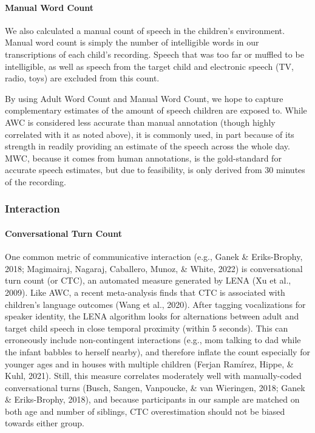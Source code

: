 \documentclass[
  man]{apa6}
\let\oldparagraph\paragraph
\renewcommand{\paragraph}[1]{\oldparagraph{#1}\mbox{}}
\begin{document}
\hypertarget{manual-word-count}{%
\paragraph{Manual Word Count}\label{manual-word-count}}

We also calculated a manual count of speech in the children's environment. Manual word count is simply the number of intelligible words in our transcriptions of each child's recording. Speech that was too far or muffled to be intelligible, as well as speech from the target child and electronic speech (TV, radio, toys) are excluded from this count.

By using Adult Word Count and Manual Word Count, we hope to capture complementary estimates of the amount of speech children are exposed to. While AWC is considered less accurate than manual annotation (though highly correlated with it as noted above), it is commonly used, in part because of its strength in readily providing an estimate of the speech across the whole day. MWC, because it comes from human annotations, is the gold-standard for accurate speech estimates, but due to feasibility, is only derived from 30 minutes of the recording.

\hypertarget{interaction}{%
\subsubsection{Interaction}\label{interaction}}

\hypertarget{conversational-turn-count}{%
\paragraph{Conversational Turn Count}\label{conversational-turn-count}}

One common metric of communicative interaction (e.g., Ganek \& Eriks-Brophy, 2018; Magimairaj, Nagaraj, Caballero, Munoz, \& White, 2022) is conversational turn count (or CTC), an automated measure generated by LENA (Xu et al., 2009). Like AWC, a recent meta-analysis finds that CTC is associated with children's language outcomes (Wang et al., 2020). After tagging vocalizations for speaker identity, the LENA algorithm looks for alternations between adult and target child speech in close temporal proximity (within 5 seconds). This can erroneously include non-contingent interactions (e.g., mom talking to dad while the infant babbles to herself nearby), and therefore inflate the count especially for younger ages and in houses with multiple children (Ferjan Ramírez, Hippe, \& Kuhl, 2021). Still, this measure correlates moderately well with manually-coded conversational turns (Busch, Sangen, Vanpoucke, \& van Wieringen, 2018; Ganek \& Eriks-Brophy, 2018), and because participants in our sample are matched on both age and number of siblings, CTC overestimation should not be biased towards either group.
\end{document}
